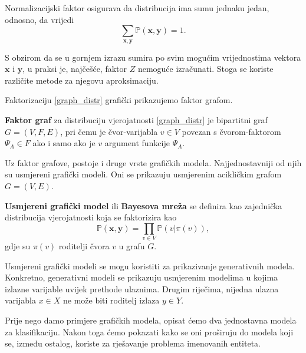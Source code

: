 \documentclass[a4paper,twoside,12pt]{memoir} %
\newcommand{\tb}{\textbf}
\begin{document}
	Normalizacijski faktor osigurava da distribucija ima sumu jednaku jedan, odnosno, da vrijedi
	\begin{equation*}
	\sum\limits_{\mathbf{x}, \mathbf{y}} \mathbb{P}(\mathbf{x}, \mathbf{y}) = 1.
	\end{equation*}

	S obzirom da se u gornjem izrazu sumira po svim mogućim vrijednostima vektora $\mathbf{x}$ i $\mathbf{y}$, u praksi je, najčešće, faktor $Z$ nemoguće izračunati. Stoga se koriste različite metode za njegovu aproksimaciju.

	\bigskip

	Faktorizaciju \eqref{graph_distr} grafički prikazujemo faktor grafom.

	\begin{defn}\label{factor_graph}
		\tb{Faktor graf} za distribuciju vjerojatnosti \eqref{graph_distr} je bipartitni graf $G = (V,F,E)$, pri čemu je čvor-varijabla $v \in V$ povezan s čvorom-faktorom $\Psi_{A} \in F$ ako i samo ako je $v$ argument funkcije $\Psi_{A}$.
	\end{defn}

	\bigskip

	Uz faktor grafove, postoje i druge vrste grafičkih modela. Najjednostavniji od njih su usmjereni grafički modeli. Oni se prikazuju usmjerenim acikličkim grafom $G = (V,E)$.

	\begin{defn}
		\tb{Usmjereni grafički model} ili \tb{Bayesova mreža} se definira kao zajednička distribucija vjerojatnosti koja se faktorizira kao
		\begin{equation*}
		\mathbb{P}( \mathbf{x}, \mathbf{y}) = \prod_{v \in V}\mathbb{P}(v|\pi(v)),
		\end{equation*}
		gdje su $\pi(v)$ roditelji čvora $v$ u grafu $G$.
	\end{defn}

	Usmjereni grafički modeli se mogu koristiti za prikazivanje generativnih modela. Konkretno, generativni modeli se prikazuju usmjerenim modelima u kojima izlazne varijable uvijek prethode ulaznima. Drugim riječima, nijedna ulazna varijabla $x \in X$ ne može biti roditelj izlaza $y \in Y$.

	\bigskip

	Prije nego damo primjere grafičkih modela, opisat ćemo dva jednostavna modela za klasifikaciju. Nakon toga ćemo pokazati kako se oni proširuju do modela koji se, između ostalog, koriste za rješavanje problema imenovanih entiteta.
\end{document}

